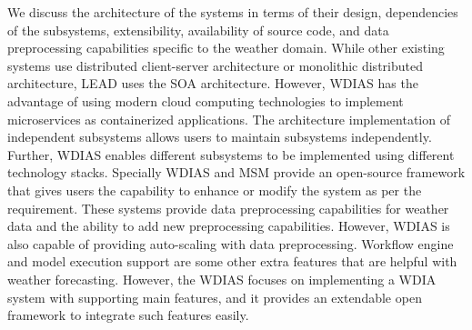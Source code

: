 We discuss the architecture of the systems in terms of their design, dependencies of the subsystems, extensibility, availability of source code, and data preprocessing capabilities specific to the weather domain. While other existing systems use distributed client-server architecture or monolithic distributed architecture, LEAD uses the SOA architecture. However, WDIAS has the advantage of using modern cloud computing technologies to implement microservices as containerized applications. The architecture implementation of independent subsystems allows users to maintain subsystems independently. Further, WDIAS enables different subsystems to be implemented using different technology stacks. Specially WDIAS and MSM provide an open-source framework that gives users the capability to enhance or modify the system as per the requirement. These systems provide data preprocessing capabilities for weather data and the ability to add new preprocessing capabilities. However, WDIAS is also capable of providing auto-scaling with data preprocessing. Workflow engine and model execution support are some other extra features that are helpful with weather forecasting. However, the WDIAS focuses on implementing a WDIA system with supporting main features, and it provides an extendable open framework to integrate such features easily.
